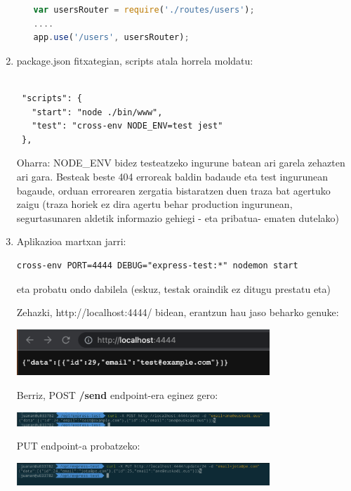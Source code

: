\begin{enumerate}
\begin{itemize}
\begin{lstlisting}[language=JavaScript,numbers=none]
var usersRouter = require('./routes/users');
....
app.use('/users', usersRouter);
\end{lstlisting}


\end{itemize}

\item 
package.json fitxategian, scripts atala horrela moldatu:


\begin{verbatim}
    
 "scripts": {
   "start": "node ./bin/www",
   "test": "cross-env NODE_ENV=test jest"
 },

\end{verbatim}


Oharra: NODE\_ENV bidez testeatzeko ingurune batean ari garela zehazten ari gara. Besteak beste 404 erroreak baldin badaude eta test ingurunean bagaude, orduan errorearen zergatia bistaratzen duen traza bat agertuko zaigu (traza horiek ez dira agertu behar production ingurunean, segurtasunaren aldetik informazio gehiegi - eta pribatua- ematen dutelako)


\item 
Aplikazioa martxan jarri:

\begin{verbatim}
cross-env PORT=4444 DEBUG="express-test:*" nodemon start    
\end{verbatim}


eta probatu ondo dabilela (eskuz, testak oraindik ez ditugu prestatu eta)

Zehazki, http://localhost:4444/ bidean, erantzun hau jaso beharko genuke:


\includegraphics[width=0.75\textwidth]{img/testing/testing_view_index.png}

Berriz, POST \textbf{/send} endpoint-era eginez gero:

\includegraphics[width=0.75\textwidth]{img/testing/testing_post.png}

PUT endpoint-a probatzeko:

\includegraphics[width=0.75\textwidth]{img/testing/testing_put.png}



\end{enumerate}
